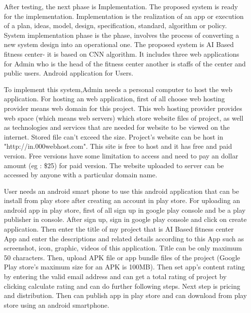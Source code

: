 \documentclass[a4paper,12pt,toc=flat]{report}
\begin{document}
{{	
	After testing, the next phase is Implementation. The proposed system is ready for the implementation. Implementation is the realization of an app or execution of a plan, ideas, model, design, specification, standard, algorithm or policy. System implementation phase is the phase, involves the process of converting a new system design into an operational one. The proposed system is AI Based fitness center- it is based on  CNN algorithm. It includes three web applications for Admin who is the head of the fitness center another is  staffs of the center and public users. Android application for Users.
	
	
	\hspace*{12pt}To implement this system,Admin needs a personal computer to host the web application. For hosting an web application, first of all choose web hosting provider means web domain for this project.
	This web hosting provider provides web space (which means web servers) which store website files of project, as well as technologies and services that are needed for website to be viewed on the internet. Stored file can't exceed the size. Project's website can be host in  "http://in.000webhost.com". This site is free to host and it has free and paid version. Free versions have some limitation to access and need to pay an dollar amount (eg : \$25) for paid version. The website uploaded to server can be accessed by anyone with a particular domain name.
	
	\hspace*{12pt}User needs an android smart phone to use this android application that can be install from play store after creating an account in play store. For uploading an android app in play store, first of all sign up in google play console and be a play publisher in console. After sign up, sign in google play console and click on create application. Then enter the title of my project that is AI Based fitness center App and enter the descriptions and related details according to this App such as screenshot, icon, graphic, videos of this application. Title can be only maximum 50 characters. Then, upload APK file or app bundle files of the project (Google Play store’s maximum size for an APK is 100MB). Then set app's content rating by entering the valid email address and can get a total rating of project by clicking calculate rating and can do further following steps.
	Next step is pricing and distribution. Then can publish app in play store and can download from play store using an android smartphone. 
	\pagebreak
	
}}
\end{document}
